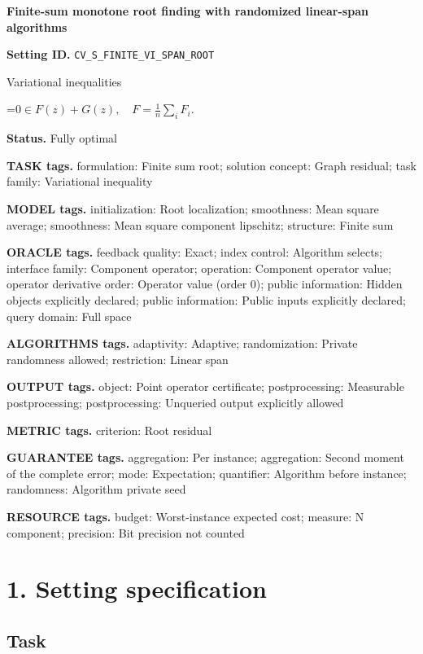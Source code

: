 \documentclass[10pt,a4paper]{article}
\newcommand{\AtlasMath}[1]{\par\begingroup\centering\setbox0=\hbox{$\displaystyle #1$}\ifdim\wd0>1.4\linewidth\typeout{ATLAS WIDE FORMULA: \the\wd0}\fi\ifdim\wd0>\linewidth\resizebox{\linewidth}{!}{\box0}\else\box0\fi\par\endgroup}
\begin{document}
\raggedright

{\LARGE\bfseries\sffamily\color{AtlasNavy} Finite-sum monotone root finding with randomized linear-span algorithms\par}\vspace{5pt}
\textbf{Setting ID.} \texttt{CV\_\allowbreak{}S\_\allowbreak{}FINITE\_\allowbreak{}VI\_\allowbreak{}SPAN\_\allowbreak{}ROOT}

Variational inequalities


\AtlasMath{0\in F(z)+G(z),\quad F=\frac1n\sum_iF_i.}


\textbf{Status.} Fully optimal

\textbf{TASK tags.} formulation: Finite sum root; solution concept: Graph residual; task family: Variational inequality

\textbf{MODEL tags.} initialization: Root localization; smoothness: Mean square average; smoothness: Mean square component lipschitz; structure: Finite sum

\textbf{ORACLE tags.} feedback quality: Exact; index control: Algorithm selects; interface family: Component operator; operation: Component operator value; operator derivative order: Operator value (order 0); public information: Hidden objects explicitly declared; public information: Public inputs explicitly declared; query domain: Full space

\textbf{ALGORITHMS tags.} adaptivity: Adaptive; randomization: Private randomness allowed; restriction: Linear span

\textbf{OUTPUT tags.} object: Point operator certificate; postprocessing: Measurable postprocessing; postprocessing: Unqueried output explicitly allowed

\textbf{METRIC tags.} criterion: Root residual

\textbf{GUARANTEE tags.} aggregation: Per instance; aggregation: Second moment of the complete error; mode: Expectation; quantifier: Algorithm before instance; randomness: Algorithm private seed

\textbf{RESOURCE tags.} budget: Worst-instance expected cost; measure: N component; precision: Bit precision not counted

\section{1. Setting specification}
\subsection{Task}
\end{document}
